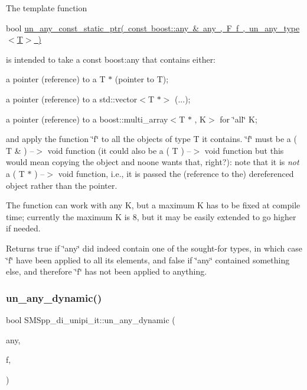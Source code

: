 The template function

bool \mbox{\hyperlink{group__boost__any__stuff_ga46275e01a585a3a4bfcc243a595aa7dd}{un\+\_\+any\+\_\+const\+\_\+static\+\_\+ptr( const boost\+::any \& any , F f , un\+\_\+any\+\_\+type$<$\+T$>$ )}}

is intended to take a const boost\+:any that contains either\+:


\begin{DoxyItemize}
\item a pointer (reference) to a T $\ast$ (pointer to T);
\item a pointer (reference) to a std\+::vector$<$\+T $\ast$$>$ (...);
\item a pointer (reference) to a boost\+::multi\+\_\+array$<$\+T $\ast$ , K$>$ for \char`\"{}all\char`\"{} K;
\end{DoxyItemize}

and apply the function \char`\"{}f\char`\"{} to all the objects of type T it contains. \char`\"{}f\char`\"{} must be a ( T \& ) --$>$ void function (it could also be a ( T ) --$>$ void function but this would mean copying the object and noone wants that, right?)\+: note that it is {\itshape not} a ( T $\ast$ ) --$>$ void function, i.\+e., it is passed the (reference to the) dereferenced object rather than the pointer.

The function can work with any K, but a maximum K has to be fixed at compile time; currently the maximum K is 8, but it may be easily extended to go higher if needed.

Returns true if \char`\"{}any\char`\"{} did indeed contain one of the sought-\/for types, in which case \char`\"{}f\char`\"{} have been applied to all its elements, and false if \char`\"{}any\char`\"{} contained something else, and therefore \char`\"{}f\char`\"{} has not been applied to anything. \mbox{\label{group__boost__any__stuff_gaf12786a4337938023337a397d0077949}} 
\subsubsection{\texorpdfstring{un\+\_\+any\+\_\+dynamic()}{un\_any\_dynamic()}}
{\footnotesize\ttfamily bool S\+M\+Spp\+\_\+di\+\_\+unipi\+\_\+it\+::un\+\_\+any\+\_\+dynamic (\begin{DoxyParamCaption}\item[{boost\+::any \&}]{any,  }\item[{F}]{f,  }\item[{\mbox{\hyperlink{struct_s_m_spp__di__unipi__it_1_1un__any__type}{un\+\_\+any\+\_\+type}}$<$ T $>$}]{ }\end{DoxyParamCaption})}

